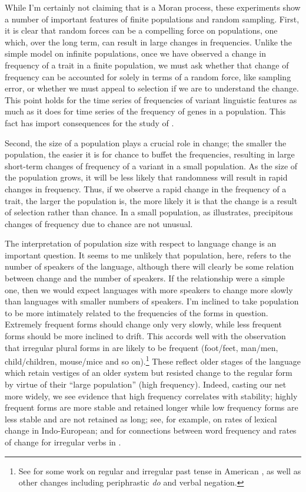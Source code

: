 \documentclass[output=paper]{langsci/langscibook}
\begin{document}
While I'm certainly not claiming that  is a Moran
process, these experiments show a number of important features of
finite populations and random sampling.  First, it is clear that
random forces can be a compelling force on populations, one which,
over the long term, can result in large changes in frequencies.
Unlike the simple model on infinite populations, once we have observed
a change in frequency of a trait in a finite population, we must ask
whether that change of frequency can be accounted for solely in terms
of a random force, like sampling error, or whether we must appeal to
selection if we are to understand the change. This point holds for the
time series of frequencies of variant linguistic features as much as
it does for time series of the frequency of genes in a population.
This fact has import consequences for the study of .

Second, the size of a population plays a crucial role in change; the smaller
the population, the easier it is for chance to buffet the frequencies,
resulting in large short-term changes of frequency of a variant in a small
population.  As the size of the population grows, it will be less likely that
randomness will result in rapid changes in frequency. Thus, if we observe a
rapid change in the frequency of a trait, the larger the population is, the
more likely it is that the change is a result of selection rather than chance.
In a small population, as  illustrates, precipitous changes
of frequency due to chance are not unusual.

The interpretation of population size with respect to language change
is an important question.  It seems to me unlikely that population,
here, refers to the number of speakers of the language, although there
will clearly be some relation between change and the number of
speakers.  If the relationship were a simple one, then we would expect
languages with more speakers to change more slowly than languages with
smaller numbers of speakers.  I'm inclined to take population to be
more intimately related to the frequencies of the forms in question.
Extremely frequent forms should change only very slowly, while less
frequent forms should be more inclined to drift.  This accords well
with the observation that irregular plural forms in  are likely
to be frequent (foot/feet, man/men, child/children, mouse/mice and so
on).\footnote{See \citet{newberry-etal:2017} for some work
  on regular and irregular past tense in American , as well as
  other changes including periphrastic \emph{do} and verbal
  negation.}  These reflect older stages of the language which retain
vestiges of an older system but resisted change to the regular form by
virtue of their ``large population'' (high frequency).  Indeed, casting
our net more widely, we see evidence that high frequency correlates
with stability; highly frequent forms are more stable and retained
longer while low frequency forms are less stable and are not retained
as long;  see, for example, \citet{pagel-etal:2007} on rates of
lexical change in Indo-European; \citet{lieberman-etal:2007} and
\citet{newberry-etal:2017} for connections between word frequency and
rates of change for irregular verbs in .
\end{document}
